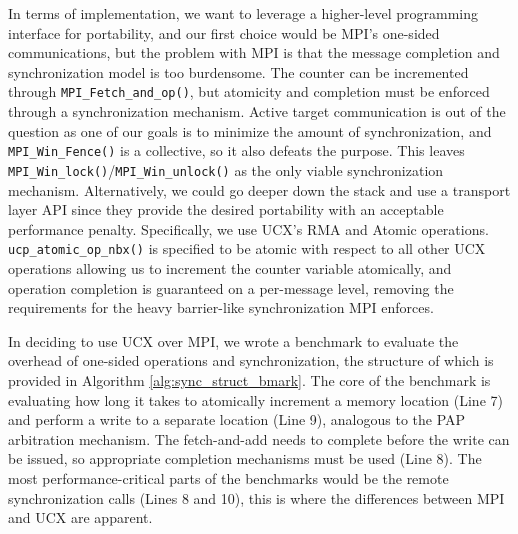 



In terms of implementation, we want to leverage a higher-level programming interface for portability, and our first choice would be \gls{MPI}'s one-sided communications, but the problem with \gls{MPI} is that the message completion and synchronization model is too burdensome. 
The counter can be incremented through \texttt{MPI\_Fetch\_and\_op()}, but atomicity and completion must be enforced through a synchronization mechanism. 
Active target communication is out of the question as one of our goals is to minimize the amount of synchronization, and \texttt{MPI\_Win\_Fence()} is a collective, so it also defeats the purpose.
This leaves \texttt{MPI\_Win\_lock()}/\texttt{MPI\_Win\_unlock()} as the only viable synchronization mechanism.
Alternatively, we could go deeper down the stack and use a transport layer API since they provide the desired portability with an acceptable performance penalty.
Specifically, we use \gls{UCX}'s \gls{RMA} and Atomic operations.
\texttt{ucp\_atomic\_op\_nbx()} is specified to be atomic with respect to all other \gls{UCX} operations allowing us to increment the counter variable atomically, and operation completion is guaranteed on a per-message level, removing the requirements for the heavy barrier-like synchronization \gls{MPI} enforces.

In deciding to use \gls{UCX} over \gls{MPI}, we wrote a benchmark to evaluate the overhead of one-sided operations and synchronization, the structure of which is provided in Algorithm \ref{alg:sync_struct_bmark}.
The core of the benchmark is evaluating how long it takes to atomically increment a memory location (Line 7) and perform a write to a separate location (Line 9), analogous to the \gls{PAP} arbitration mechanism.
The fetch-and-add needs to complete before the write can be issued, so appropriate completion mechanisms must be used (Line 8).
The most performance-critical parts of the benchmarks would be the remote synchronization calls (Lines 8 and 10), this is where the differences between \gls{MPI} and \gls{UCX} are apparent.  

